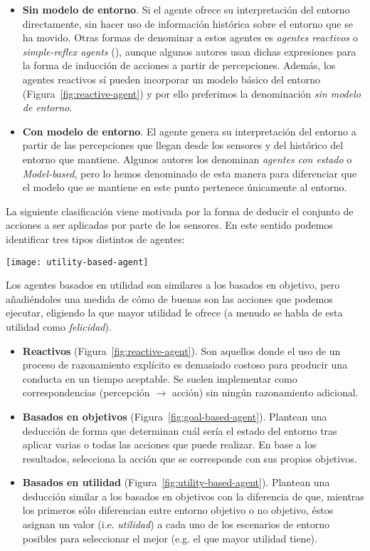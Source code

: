 \begin{itemize}
	\item \textbf{Sin modelo de entorno}. Si el agente ofrece su interpretación del entorno directamente, sin hacer uso de información histórica sobre el entorno que se ha movido. Otras formas de denominar a estos agentes es \textit{agentes reactivos} o \textit{simple-reflex agents} (\cite{russell2003artificial}), aunque algunos autores usan dichas expresiones para la forma de inducción de acciones a partir de percepciones. Además, los agentes reactivos sí pueden incorporar un modelo básico del entorno (Figura~\ref{fig:reactive-agent}) y por ello preferimos la denominación \textit{sin modelo de entorno}.
	\item \textbf{Con modelo de entorno}. El agente genera su interpretación del entorno a partir de las percepciones que llegan desde los sensores y del histórico del entorno que mantiene. Algunos autores los denominan \textit{agentes con estado} o \textit{Model-based}, pero lo hemos denominado de esta manera para diferenciar que el modelo que se mantiene en este punto pertenece únicamente al entorno.
\end{itemize}

La siguiente clasificación viene motivada por la forma de deducir el conjunto de acciones a ser aplicadas por parte de los sensores. En este sentido podemos identificar tres tipos distintos de agentes:

\begin{marginfigure}
	\texttt{[image: utility-based-agent]}
	\caption[Esquema de agente basado en utilidad]{Los agentes basados en utilidad son similares a los basados en objetivo, pero añadiéndoles una medida de cómo de buenas son las acciones que podemos ejecutar, eligiendo la que mayor utilidad le ofrece (a menudo se habla de esta utilidad como \textit{felicidad}).}
	\label{fig:utility-based-agent}
\end{marginfigure}

\begin{itemize}
	\item \textbf{Reactivos} (Figura~\ref{fig:reactive-agent}). Son aquellos donde el uso de un proceso de razonamiento explícito es demasiado costoso para producir una conducta en un tiempo aceptable. Se suelen implementar como correspondencias (percepción $\rightarrow$ acción) sin ningún razonamiento adicional.
	\item \textbf{Basados en objetivos} (Figura~\ref{fig:goal-based-agent}). Plantean una deducción de forma que determinan cuál sería el estado del entorno tras aplicar varias o todas las acciones que puede realizar. En base a los resultados, selecciona la acción que se corresponde con sus propios objetivos.
	\item \textbf{Basados en utilidad} (Figura~\ref{fig:utility-based-agent}). Plantean una deducción similar a los basados en objetivos con la diferencia de que, mientras los primeros sólo diferencian entre entorno objetivo o no objetivo, éstos asignan un valor (i.e. \textit{utilidad}) a cada uno de los escenarios de entorno posibles para seleccionar el mejor (e.g. el que mayor utilidad tiene).
\end{itemize}


